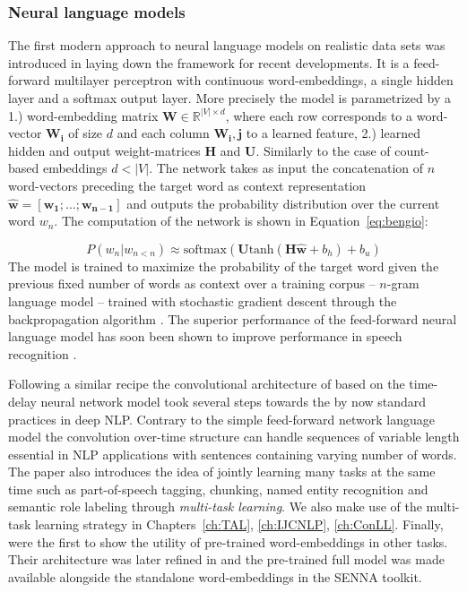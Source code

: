 \subsubsection{Neural language models}
\label{sec:NNLM}
The first modern approach to neural language models on realistic data sets was introduced
in \cite{bengio2003neural} laying down the framework for recent developments.
It is a feed-forward multilayer perceptron with continuous word-embeddings,
a single hidden layer and a softmax output layer.
More precisely the model is parametrized by a 1.) word-embedding matrix
$\mathbf{W} \in \mathbb{R}^{|V| \times d}$, where each row corresponds to a word-vector
$\mathbf{W_i}$ of size $d$ and each column $\mathbf{W_i,j}$ to a learned feature, 2.)
learned hidden and output weight-matrices $\mathbf{H}$ and $\mathbf{U}$. Similarly
to the case of count-based embeddings $d < |V|$.
The network takes as input the concatenation of $n$ word-vectors preceding the target word as context
representation $\hat{\mathbf{w}} = [\mathbf{w_1}; \ldots; \mathbf{w_{n-1}}]$
and outputs the probability distribution over the current word $w_n$.
The computation of the network is shown in Equation~\ref{eq:bengio}:

\begin{equation}
\label{eq:bengio}
P(w_n|w_{n<n}) \approx \text{softmax}(\mathbf{U} \text{tanh}(\mathbf{H} \mathbf{\hat{w}} + b_h ) + b_u)
\end{equation}
The model is trained to maximize the probability of
the target word given the previous fixed number of words as context over a training corpus
-- $n$-gram language model -- trained with stochastic gradient descent \citep{cauchy1847methode}
through the backpropagation algorithm \citep{rumelhart1985learning}.
The superior performance of the feed-forward neural language model has soon been shown to
improve performance in speech recognition \citep{schwenk2005training}.

Following a similar recipe the convolutional architecture of \cite{collobert2008unified}
based on the time-delay neural network model \citep{waibel1990phoneme} took several steps towards the
by now standard practices in deep NLP.
Contrary to the simple feed-forward network language model the convolution over-time structure can handle
sequences of variable length essential in NLP applications with sentences containing varying number of words.
The paper also introduces the idea of jointly learning many tasks at the same time such as part-of-speech
tagging, chunking, named entity recognition and semantic role labeling through \emph{multi-task learning}.
We also make use of the multi-task learning strategy in Chapters~\ref{ch:TAL}, \ref{ch:IJCNLP}, \ref{ch:ConLL}.
Finally, \cite{collobert2008unified} were the first to show the utility of pre-trained word-embeddings
in other tasks. Their architecture was later refined in \cite{collobert2011natural} and the pre-trained
full model was made available alongside the standalone word-embeddings in the SENNA toolkit.

